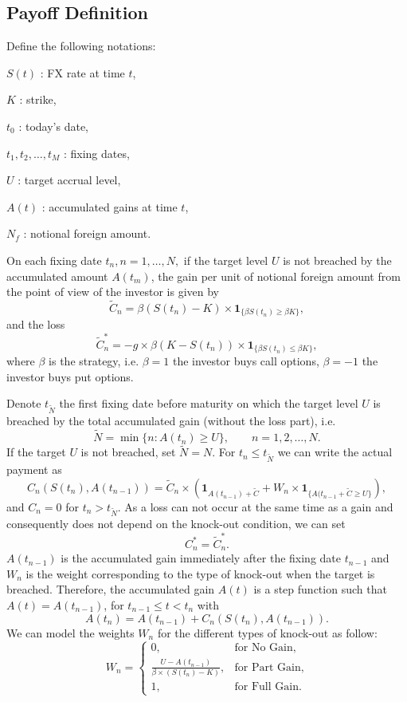 \subsection*{Payoff Definition}
\label{sec:intro:Payoff}
Define the following notations:
\begin{my_list_item}
\item $S(t)$ : FX rate at time $t$,
\item $K$ : strike,
\item $t_0$ : today's date,
\item $t_1,t_2,\ldots,t_M$ : fixing dates,
\item $U$ : target accrual level,
\item $A(t)$ : accumulated gains at time $t$,
\item $N_f$ : notional foreign amount.
\end{my_list_item}

On each fixing date $t_n, n = 1,\ldots,N,$ if the target level $U$ is not breached by the accumulated amount $A(t_m)$, the gain per unit of notional foreign amount from the point of view of the investor is given by
\[\tilde{C}_n = \beta(S(t_n)-K)\times \mathbf{1}_{\{\beta S(t_n)\geq \beta K\}}, \]
and the loss
\[\tilde{C}_n^\ast = -g \times \beta(K-S(t_n))\times \mathbf{1}_{\{\beta S(t_n)\leq \beta K\}}, \]
where $\beta$ is the strategy, i.e. $\beta = 1$ the investor buys call options, $\beta = -1$ the investor buys put options.

Denote $t_{\tilde{N}}$ the first fixing date before maturity on which the target level $U$ is breached by the total accumulated gain (without the loss part), i.e.
\[\tilde{N}=\min\{n: A(t_n)\geq U\},\qquad n = 1,2,\ldots,N.\]
If the target $U$ is not breached, set $\tilde{N} = N$. For $t_n \leq t_{\tilde{N}}$ we can write the actual payment as
\[C_n(S(t_n),A(t_{n-1})) = \tilde{C}_n\times (\mathbf{1}_{A(t_{n-1})+\tilde{C}}+W_n\times\mathbf{1}_{\{A(t_{n-1}+\tilde{C}\geq U\}}),\]
and $C_n=0$ for $t_n>t_{\tilde{N}}$. As a loss can not occur at the same time as a gain and consequently does not depend on the knock-out condition, we can set
\[C^\ast_n = \tilde{C}_n^\ast.\]
$A(t_{n-1})$ is the accumulated gain immediately after the fixing date $t_{n-1}$ and $W_n$ is the weight corresponding to the type of knock-out when the target is breached. Therefore, the accumulated gain $A(t)$ is a step function such that $A(t) = A(t_{n-1})$, for $t_{n-1}\leq t < t_n$ with
\[A(t_n)= A(t_{n-1}) + C_n(S(t_n),A(t_{n-1})).\]
We can model the weights $W_n$ for the different types of knock-out as follow:
\[W_n = \begin{cases}
0, &\text{for No Gain,} \\
\frac{U-A(t_{n-1})}{\beta\times(S(t_n)-K)}, & \text{for Part Gain,}\\
1, &\text{for Full Gain.}
\end{cases}\]

